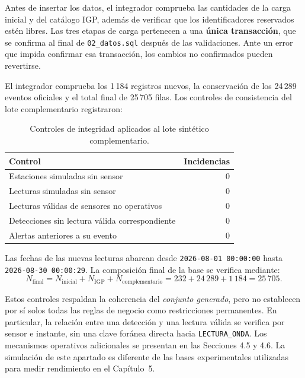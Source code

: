 \documentclass[12pt,a4paper]{article}
\begin{document}
Antes de insertar los datos, el integrador comprueba las cantidades de
la carga inicial y del catálogo IGP, además de verificar que los
identificadores reservados estén libres. Las tres etapas de carga
pertenecen a una \textbf{única transacción}, que se confirma al final
de \texttt{02\_datos.sql} después de las validaciones. Ante un error
que impida confirmar esa transacción, los cambios no confirmados
pueden revertirse.

El integrador comprueba los 1\,184 registros nuevos, la conservación
de los 24\,289 eventos oficiales y el total final de 25\,705 filas.
Los controles de consistencia del lote complementario registraron:

\begin{table}[H]
\centering\small
\begin{tabular}{p{10cm}r}
\toprule
\textbf{Control} & \textbf{Incidencias} \\
\midrule
Estaciones simuladas sin sensor & 0 \\
Lecturas simuladas sin sensor & 0 \\
Lecturas válidas de sensores no operativos & 0 \\
Detecciones sin lectura válida correspondiente & 0 \\
Alertas anteriores a su evento & 0 \\
\bottomrule
\end{tabular}
\caption{Controles de integridad aplicados al lote sintético complementario.}
\label{tab:integridad-simulada-43}
\end{table}

Las fechas de las nuevas lecturas abarcan desde
\texttt{2026-08-01 00:00:00} hasta \texttt{2026-08-30 00:00:29}.
La composición final de la base se verifica mediante:
\[
N_{\mathrm{final}} = N_{\mathrm{inicial}} + N_{\mathrm{IGP}} + N_{\mathrm{complementario}}
= 232 + 24\,289 + 1\,184 = 25\,705.
\]

Estos controles respaldan la coherencia del \emph{conjunto generado},
pero no establecen por sí solos todas las reglas de negocio como
restricciones permanentes. En particular, la relación entre una
detección y una lectura válida se verifica por sensor e instante,
sin una clave foránea directa hacia \texttt{LECTURA\_ONDA}.
Los mecanismos operativos adicionales se presentan en las
Secciones 4.5 y 4.6. La simulación de este apartado es diferente de
las bases experimentales utilizadas para medir rendimiento en el
Capítulo~5.


\end{document}
